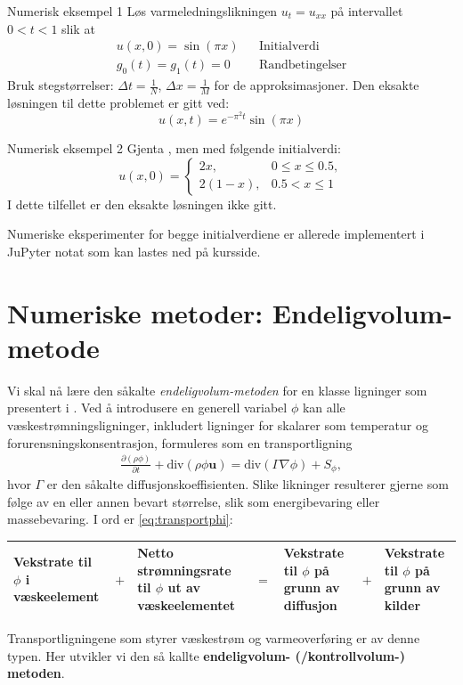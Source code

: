 \begin{eks}{Numerisk eksempel 1}
\label{ex:numex1}
Løs varmeledningslikningen \( u_t = u_{xx} \) på intervallet \( 0 < t < 1 \) slik at
\begin{align*}
 u(x, 0) = \sin(\pi x) && \text{Initialverdi}\\
 g_0(t) = g_1(t) = 0  && \text{Randbetingelser}
 \end{align*}
 Bruk stegstørrelser: \( \Delta t = \frac{1}{N} \), \( \Delta x = \frac{1}{M} \) for de approksimasjoner. 
Den eksakte løsningen til dette problemet er gitt ved:
\[
u(x, t) = e^{-\pi^2 t} \sin(\pi x)
\]
\end{eks}
\begin{eks}{Numerisk eksempel 2}
Gjenta , men med følgende initialverdi:
\[
u(x, 0) =
\begin{cases}
2x, & 0 \leq x \leq 0.5, \\
2(1 - x), & 0.5 < x \leq 1
\end{cases}
\]
I dette tilfellet er den eksakte løsningen ikke gitt.
\end{eks}
Numeriske eksperimenter for begge initialverdiene er allerede implementert i JuPyter notat som kan lastes ned på kursside.

\section{Numeriske metoder: Endeligvolum-metode}
\label{sec:EndeligVolum}
Vi skal nå lære den såkalte \emph{endeligvolum-metoden} for en klasse ligninger som presentert i \cite[Chapter 4]{VaM07}. Ved å introdusere en generell variabel $\phi$ kan alle væskestrømningsligninger, inkludert ligninger for skalarer som temperatur og forurensningskonsentrasjon, formuleres som en transportligning
\begin{align}\label{eq:transportphi}
\frac{\partial (\rho \phi)}{\partial t} + \text{div}(\rho \phi \mathbf{u}) = \text{div}(\Gamma \nabla \phi) + S_{\phi},
\end{align}
hvor $\Gamma$ er den såkalte diffusjonskoeffisienten. Slike likninger resulterer gjerne som følge av en eller annen bevart størrelse, slik som energibevaring eller massebevaring. I ord er \eqref{eq:transportphi}: 
\begin{center}
\setlength{\extrarowheight}{4pt}
\begin{tabular}{|>{\raggedright}p{2.4cm}>{\centering}p{0.5cm}>{\raggedright}p{2.8cm}>{\centering}p{0.5cm}>{\raggedright}p{2.4cm}>{\centering}p{0.5cm}>{\raggedright\arraybackslash}p{2.4cm}|}
\hline
Vekstrate til $\phi$ i væskeelement & \vspace{.2cm} $+$ &
Netto strømningsrate til $\phi$ ut av væskeelementet & \vspace{.2cm} $=$ &
Vekstrate til $\phi$ på grunn av diffusjon & \vspace{.2cm} $+$ &
Vekstrate til $\phi$ på grunn av kilder \\
\hline
\end{tabular}
\end{center}
Transportligningene som styrer væskestrøm og varmeoverføring er av denne typen. Her utvikler vi den så kallte \textbf{endeligvolum- (/kontrollvolum-) metoden}.

